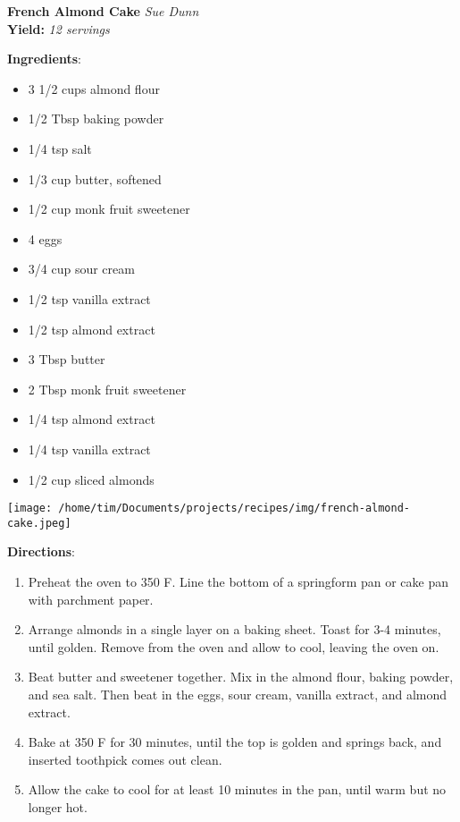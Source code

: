 \documentclass[11pt, twoside, openany]{book}
\begin{document}
\noindent\begin{minipage}[t]{\linewidth}%
{\Large\textbf{French Almond Cake}} \label{french-almond-cake}\hfill\textit{Sue Dunn}\\
\textbf{Yield:} \textit{12 servings}\\
\noindent\begin{minipage}[t]{0.78\linewidth}%
\textbf{Ingredients}:\vspace{-3mm}
\begin{multicols}{2}
\begin{itemize}\setlength\itemsep{-1mm}
\item 3 1/2 cups almond flour
\item 1/2 Tbsp baking powder
\item 1/4 tsp salt
\item 1/3 cup butter, softened
\item 1/2 cup monk fruit sweetener
\item 4 eggs
\item 3/4 cup sour cream
\item 1/2 tsp vanilla extract
\item 1/2 tsp almond extract
\item 3 Tbsp butter
\item 2 Tbsp monk fruit sweetener
\item 1/4 tsp almond extract
\item 1/4 tsp vanilla extract
\item 1/2 cup sliced almonds
\end{itemize}
\end{multicols}
\end{minipage}
\noindent\begin{minipage}[t]{0.18\linewidth}
\centering \strut\vspace*{-\baselineskip}\newline
\texttt{[image: /home/tim/Documents/projects/recipes/img/french-almond-cake.jpeg]}\\
\end{minipage}\vspace{3mm}
\textbf{Directions}:
\vspace{-3mm}\begin{enumerate}\setlength\itemsep{-1mm}
\item Preheat the oven to 350 F. Line the bottom of a springform pan or cake pan with parchment paper.
\item Arrange almonds in a single layer on a baking sheet. Toast for 3-4 minutes, until golden. Remove from the oven and allow to cool, leaving the oven on.
\item Beat butter and sweetener together. Mix in the almond flour, baking powder, and sea salt. Then beat in the eggs, sour cream, vanilla extract, and almond extract.
\item Bake at 350 F for 30 minutes, until the top is golden and springs back, and inserted toothpick comes out clean.
\item Allow the cake to cool for at least 10 minutes in the pan, until warm but no longer hot.
\end{enumerate}
\end{minipage}\vspace{8mm}
\end{document}
